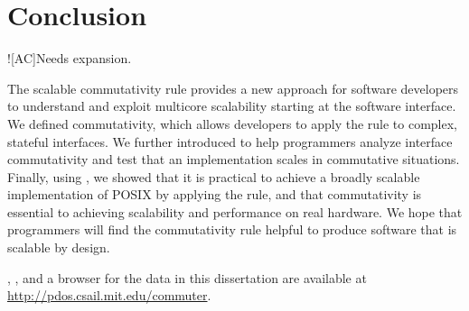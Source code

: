 \section{Conclusion}
\label{sec:concl}


\XXX![AC]{Needs expansion.}

The scalable commutativity rule provides a new approach for software
developers to understand and exploit multicore scalability starting at
the software interface.
%
We defined \SIM commutativity, which allows developers to apply the
rule to complex, stateful interfaces.
%
We further introduced \tool to help programmers analyze interface
commutativity and test that an implementation scales in commutative
situations.
%
Finally, using \sys, we showed that it is practical to achieve a
broadly scalable implementation of POSIX by applying the rule, and
that commutativity is essential to achieving scalability and
performance on real hardware.
%
We hope that programmers will find the commutativity rule helpful to
produce software that is scalable by design.

\tool, \sys, and a browser for the data in this dissertation are
available at
\url{http://pdos.csail.mit.edu/commuter}.
